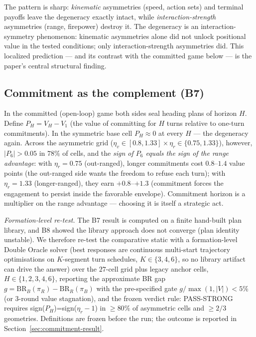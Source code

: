 \documentclass[12pt,a4paper]{article}
\newcommand{\etav}{\eta_v}
\newcommand{\etar}{\eta_r}
\begin{document}
The pattern is sharp: \emph{kinematic} asymmetries (speed, action sets) and
terminal payoffs leave the degeneracy exactly intact, while
\emph{interaction-strength} asymmetries (range, firepower) destroy it.  The
degeneracy is an interaction-symmetry phenomenon: kinematic asymmetries alone did not unlock
positional value in the tested conditions; only interaction-strength
asymmetries did.  This
localized prediction --- and its contrast with the committed game below ---
is the paper's central structural finding.

\subsection{Commitment as the complement (B7)}\label{sec:commitment}

In the committed (open-loop) game both sides seal heading plans of horizon
$H$.  Define $P_H=V_H-V_1$ (the value of committing for $H$ turns relative
to one-turn commitments).  In the symmetric base cell $P_H\approx0$ at
every $H$ --- the degeneracy again.  Across the asymmetric grid
($\etav\in[0.8,1.33]\times\etar\in\{0.75,1.33\}$), however,
$|P_6|>0.05$ in $78\%$ of cells, and the \emph{sign of $P_6$ equals the
sign of the range advantage}: with $\etar=0.75$ (out-ranged), longer
commitments cost $0.8$--$1.4$ value points (the out-ranged side wants the
freedom to refuse each turn); with $\etar=1.33$ (longer-ranged), they earn
$+0.8$--$+1.3$ (commitment forces the engagement to persist inside the
favorable envelope).  Commitment horizon is a multiplier on the range
advantage --- choosing it is itself a strategic act.

\noindent\emph{Formation-level re-test.}  The B7 result is computed on a
finite hand-built plan library, and B8 showed the library approach does not
converge (plan identity unstable).  We therefore re-test the comparative
static with a formation-level Double Oracle solver (best responses are
continuous multi-start trajectory optimisations on $K$-segment turn
schedules, $K\in\{3,4,6\}$, so no library artifact can drive the answer)
over the $27$-cell grid plus legacy anchor cells, $H\in\{1,2,3,4,6\}$,
reporting the approximate BR gap $g=\mathrm{BR}_B(\pi_R)-\mathrm{BR}_R
(\pi_B)$ with the pre-specified gate $g/\max(1,|V|)<5\%$ (or $3$-round
value stagnation), and the frozen verdict rule: PASS-STRONG requires
sign($P_H$)=sign($\etar-1$) in $\ge80\%$ of asymmetric cells and $\ge2/3$
geometries.  Definitions are frozen before the run; the outcome is
reported in Section~\ref{sec:commitment-result}.
\end{document}

